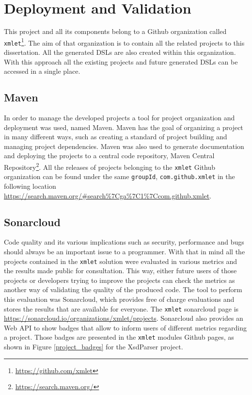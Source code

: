 \chapter{Deployment and Validation}
\label{cha:deployment}

This project and all its components belong to a Github organization called \texttt{xmlet}\footnote{\url{https://github.com/xmlet}}. The aim of that organization is to contain all the related projects to this dissertation. All the generated \ac{DSL}s are also created within this organization. With this approach all the existing projects and future generated \ac{DSL}s can be accessed in a single place.

\section{Maven} %
\label{sec:maven}

In order to manage the developed projects a tool for project organization and deployment was used, named Maven\cite{maven}. Maven has the goal of organizing a project in many different ways, such as creating a standard of project building and managing project dependencies. Maven was also used to generate documentation and deploying the projects to a central code repository, Maven Central Repository\footnote{\url{https://search.maven.org/}}. All the releases of projects belonging to the \texttt{xmlet} Github organization can be found under the same \texttt{groupId}, \texttt{com.github.xmlet} in the following location \url{https://search.maven.org/#search%7Cga%7C1%7Ccom.github.xmlet}. 

\section{Sonarcloud} %
\label{sec:sonarcloud}

Code quality and its various implications such as security, performance and bugs should always be an important issue to a programmer. With that in mind all the projects contained in the \texttt{xmlet} solution were evaluated in various metrics and the results made public for consultation. This way, either future users of those projects or developers trying to improve the projects can check the metrics as another way of validating the quality of the produced code. The tool to perform this evaluation was Sonarcloud, which provides free of charge evaluations and stores the results that are available for everyone. The \texttt{xmlet} sonarcloud page is \url{https://sonarcloud.io/organizations/xmlet/projects}. Sonarcloud also provides an Web \ac{API} to show badges that allow to inform users of different metrics regarding a project. Those badges are presented in the \texttt{xmlet} modules Github pages, as shown in Figure \ref{project_badges} for the XsdParser project.

